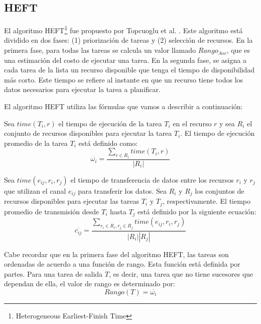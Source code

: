 \subsection{HEFT}
\label{alg:heft}
El algoritmo HEFT\footnote{Heterogeneous Earliest-Finish Time} fue propuesto por Topcuoglu et al. \cite{topcuoglu2002performance}. Este algoritmo está dividido en dos fases: (1) priorización de tareas y (2) selección de recursos. En la primera fase, para todas las tareas se calcula un valor llamado $Rango_{Asc}$, que es una estimación del costo de ejecutar una tarea. En la segunda fase, se asigna a cada tarea de la lista un recurso disponible que tenga el tiempo de disponibilidad más corto. Este tiempo se refiere al instante en que un recurso tiene todos los datos necesarios para ejecutar la tarea a planificar.




El algoritmo HEFT utiliza las fórmulas que vamos a describir a continuación:


Sea $time(T_i, r)$ el tiempo de ejecución de la tarea $T_i$ en el recurso $r$ y sea $R_i$ el conjunto de recursos disponibles para ejecutar la tarea $T_i$. El tiempo de ejecución promedio de la tarea $T_i$ está definido como:
\begin{equation}
\label{ecc:heft1}
\overline{\omega_i} = \frac{\sum_{r \in R_i} time(T_i, r)}{|R_i|}
\end{equation}

Sea $time(e_{ij}, r_i, r_j)$ el tiempo de transferencia de datos entre los recursos $r_i$ y $r_j$ que utilizan el canal $e_{ij}$ para transferir los datos. Sea $R_i$ y $R_j$ los conjuntos de recursos disponibles para ejecutar las tareas $T_i$ y $T_j$, respectivamente. El tiempo promedio de transmisión desde $T_i$ hasta $T_j$ está definido por la siguiente ecuación:
\begin{equation}
\label{ecc:heft2}
\overline{c_{ij}} = \frac{ \sum_{r_i \in R_i, r_j \in R_j} {time(e_{ij}, r_i, r_j)} }{|R_i| |R_j|}
\end{equation}

Cabe recordar que en la primera fase del algoritmo HEFT, las tareas son ordenadas de acuerdo a una función de rango. Esta función está definida por partes. Para una tarea de salida $T$, es decir, una tarea que no tiene sucesores que dependan de ella, el valor de rango es determinado por:
\begin{equation}
\label{ecc:heft3}
Rango(T) = \overline{\omega_i}
\end{equation}

